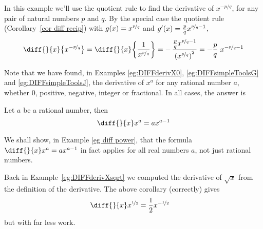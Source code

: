 \begin{eg}\label{eg:DIFFsimpleToolsJ}
In this example we'll use the quotient rule to find the derivative of
$x^{-p/q}$, for any pair of natural numbers $p$ and $q$. By the special case
the quotient rule (Corollary~\ref{cor diff recip}) with
$g(x)=x^{\nicefrac{p}{q}}$ and $g'(x)=\frac{p}{q}x^{\nicefrac{p}{q}-1}$,
\begin{align*}
\diff{}{x}\big\{x^{-\nicefrac{p}{q}}\big\}
=\diff{}{x}\bigg\{\frac{1}{x^{\nicefrac{p}{q}}}\bigg\}
=-\,\frac{\frac{p}{q}x^{\nicefrac{p}{q}-1}}{{(x^{\nicefrac{p}{q}})}^2}
=-\frac{p}{q}\ x^{-\nicefrac{p}{q}-1}
\end{align*}
\end{eg}

Note that we have found, in Examples \ref{eg:DIFFderivX0},
\ref{eg:DIFFsimpleToolsG} and \ref{eg:DIFFsimpleToolsJ},
the derivative of $x^a$ for any rational number $a$, whether
0, positive, negative, integer or fractional. In all cases, the answer
is
\begin{cor}[Derivative of $x^a$]\label{cor:DIFFxtoa}
  Let $a$ be a rational number, then
\begin{equation}
\diff{}{x} x^a = a x^{a-1}
\end{equation}
\end{cor}
\noindent We shall show, in Example \ref{eg diff power}, that the formula 
$\diff{}{x} x^a = a x^{a-1}$ in fact applies for all real numbers $a$, not just rational numbers.

Back in Example~\ref{eg:DIFFderivXsqrt} we computed the derivative of $\sqrt{x}$ from the
definition of the derivative. The above corollary (correctly) gives
\begin{align*}
  \diff{}{x} x^{\nicefrac{1}{2}} &= \frac{1}{2} x^{-\nicefrac{1}{2}}
\end{align*}
but with far less work.


